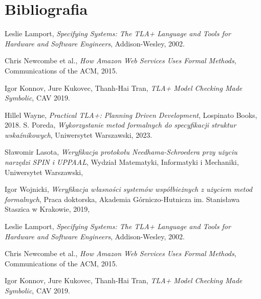 \documentclass[conference]{IEEEtran}
\begin{document}
    
    \section{Bibliografia}
        \begin{thebibliography}{00}
            Leslie Lamport, \emph{Specifying Systems: The TLA+ Language and Tools for Hardware and Software Engineers}, Addison-Wesley, 2002.
          
            Chris Newcombe et al., \emph{How Amazon Web Services Uses Formal Methods}, Communications of the ACM, 2015.
          
            Igor Konnov, Jure Kukovec, Thanh-Hai Tran, \emph{TLA+ Model Checking Made Symbolic}, CAV 2019.
          
            Hillel Wayne, \emph{Practical TLA+: Planning Driven Development}, Lospinato Books, 2018.
            S. Poreda,
            \textit{Wykorzystanie metod formalnych do specyfikacji struktur wskaźnikowych},
            Uniwersytet Warszawski, 2023.
        
            Sławomir Lasota,
            \textit{Weryfikacja protokołu Needhama-Schroedera przy użyciu narzędzi SPIN i UPPAAL},
            Wydział Matematyki, Informatyki i Mechaniki, Uniwersytet Warszawski,
        
            Igor Wojnicki,
            \textit{Weryfikacja własności systemów współbieżnych z użyciem metod formalnych},
            Praca doktorska, Akademia Górniczo-Hutnicza im. Stanisława Staszica w Krakowie, 2019,

            Leslie Lamport, \emph{Specifying Systems: The TLA+ Language and Tools for Hardware and Software Engineers}, Addison-Wesley, 2002.
        
            Chris Newcombe et al., \emph{How Amazon Web Services Uses Formal Methods}, Communications of the ACM, 2015.
        
            Igor Konnov, Jure Kukovec, Thanh-Hai Tran, \emph{TLA+ Model Checking Made Symbolic}, CAV 2019.
        

\end{thebibliography}
\end{document}
